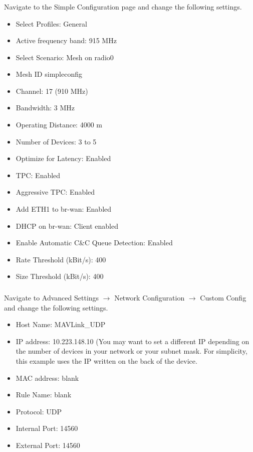             \subsubsection{} Navigate to the Simple Configuration page and change the following settings.
                \begin{itemize}
                    \item Select Profiles: General
                    \item Active frequency band: 915 MHz
                    \item Select Scenario: Mesh on radio0
                    \item Mesh ID simpleconfig
                    \item Channel: 17 (910 MHz)
                    \item Bandwidth: 3 MHz
                    \item Operating Distance: 4000 m
                    \item Number of Devices: 3 to 5
                    \item Optimize for Latency: Enabled
                    \item TPC: Enabled
                    \item Aggressive TPC: Enabled
                    \item Add ETH1 to br-wan: Enabled
                    \item DHCP on br-wan: Client enabled
                    \item Enable Automatic C\&C Queue Detection: Enabled
                    \item Rate Threshold (kBit/s):  400
                    \item Size Threshold (kBit/s):  400
                \end{itemize} 
            \subsubsection{} Navigate to Advanced Settings $\rightarrow$ Network Configuration $\rightarrow$ Custom Config and change the following settings.
                \begin{itemize}
                    \item Host Name: MAVLink\_UDP
                    \item IP address: 10.223.148.10 (You may want to set a different IP depending on the number of devices in your network or your subnet mask. For simplicity, this example uses the IP written on the back of the device.
                    \item MAC address: blank
                    \item Rule Name: blank
                    \item Protocol: UDP
                    \item Internal Port: 14560
                    \item External Port: 14560
                \end{itemize} 
        
            
            